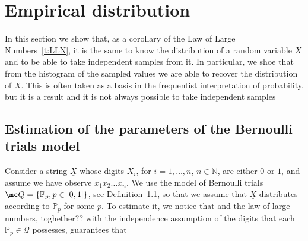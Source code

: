 	\section{ Empirical distribution}

	In this section we show that, as a corollary of the Law of Large Numbers~\ref{t:LLN}, it is the same to know the distribution of a random variable $X$ and to be able to take independent samples from it. In particular, we shoe that from the histogram of the sampled values we are able to recover the distribution of $X$. This is often taken as a basis in the frequentist interpretation of probability, but it is a result and it is not always possible to take independent samples 

		\subsection{Estimation of the parameters of the Bernoulli trials model }
		\begin{example}
			\label{ex:estimate_Bernoulli}	Consider a string $\underline X$ whose digits $X_i$, for $i = 1 , \ldots, n$, $n \in \mathbb N$,  are either $0$ or $1$, and assume we have observe $x_1x_2 \ldots x_n $. We use the model of Bernoulli trials $\mc Q = \{\mathbb P_p, p \in [0,1]\}$, see Definition~\ref{}, so that we assume that $\underline X$ distributes according to $\mathbb P_p$ for some $p$. To estimate it, we notice that
	and the law of large numbers, toghether?? with the independence assumption of the digits that each $\mathbb P_p \in  \mathcal Q$ possesses, guarantees that
	\end{example}
